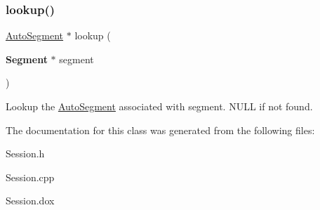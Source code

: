 \mbox{\label{classKatabatic_1_1Session_a6e465f0a592fee7e1e45b6c825b8a5da}} 
\subsubsection{\texorpdfstring{lookup()}{lookup()}\hspace{0.1cm}{\footnotesize\ttfamily [2/2]}}
{\footnotesize\ttfamily \mbox{\hyperlink{classKatabatic_1_1AutoSegment}{Auto\+Segment}} $\ast$ lookup (\begin{DoxyParamCaption}\item[{\textbf{ Segment} $\ast$}]{segment }\end{DoxyParamCaption})\hspace{0.3cm}{\ttfamily [static]}}

Lookup the \mbox{\hyperlink{classKatabatic_1_1AutoSegment}{Auto\+Segment}} associated with {\ttfamily segment}. {\ttfamily N\+U\+LL} if not found. 

The documentation for this class was generated from the following files\+:\begin{DoxyCompactItemize}
\item 
Session.\+h\item 
Session.\+cpp\item 
Session.\+dox\end{DoxyCompactItemize}
